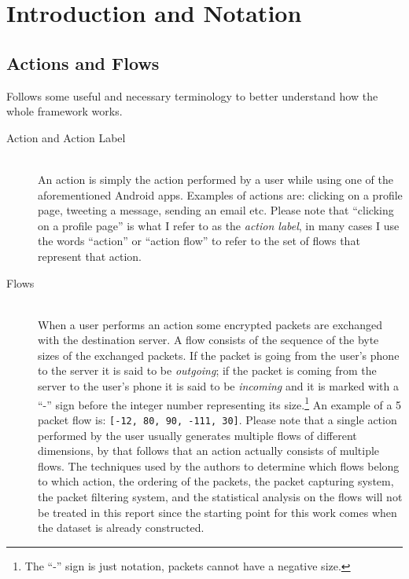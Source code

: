 \section{Introduction and Notation}
\label{sec:intro}

\subsection{Actions and Flows}
\label{subsec:flows}
Follows some useful and necessary terminology to better understand how the whole framework works.

\begin{description}
  \item[Action and Action Label] \hfill \\ An action is simply the action performed by a user while using one of the aforementioned Android apps. Examples of actions are: clicking on a profile page, tweeting a message, sending an email etc. Please note that ``clicking on a profile page'' is what I refer to as the \textit{action label}, in many cases I use the words ``action'' or ``action flow'' to refer to the set of flows that represent that action. 
  \item[Flows] \hfill \\ When a user performs an action some encrypted packets are exchanged with the destination server. A flow consists of the sequence of the byte sizes of the exchanged packets. If the packet is going from the user's phone to the server it is said to be \textit{outgoing}; if the packet is coming from the server to the user's phone it is said to be \textit{incoming} and it is marked with a ``-'' sign before the integer number representing its size.\footnote{The ``-'' sign is just notation, packets cannot have a negative size.} An example of a 5 packet flow is: \texttt{[-12, 80, 90, -111, 30]}. Please note that a single action performed by the user usually generates multiple flows of different dimensions, by that follows that an action actually consists of multiple flows. The techniques used by the authors to determine which flows belong to which action, the ordering of the packets, the packet capturing system, the packet filtering system, and the statistical analysis on the flows will not be treated in this report since the starting point for this work comes when the dataset is already constructed.
\end{description}

